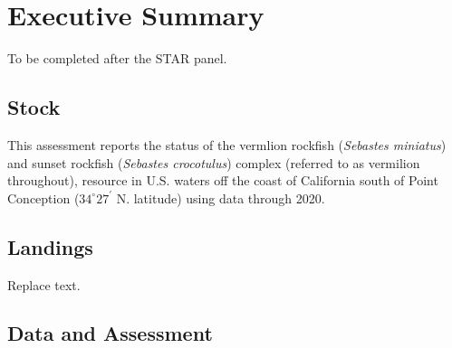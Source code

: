\documentclass[11pt,
  english,
  a4paper,
]{article}
\begin{document}
\newcommand{\lt}{\ensuremath <}
\newcommand{\gt}{\ensuremath >}

\pagebreak
{}
\setcounter{page}{1}

\renewcommand{\thetable}{\roman{table}}
\renewcommand{\thefigure}{\roman{figure}}

\setlength\parskip{0.5em plus 0.1em minus 0.2em}


\hypertarget{executive-summary}{%
\section*{Executive Summary}\label{executive-summary}}

\leavevmode\tagmcend\tagstructend

To be completed after the STAR panel.


\hypertarget{stock}{%
\subsection*{Stock}\label{stock}}

\leavevmode\tagmcend\tagstructend

This assessment reports the status of the vermlion rockfish (\emph{Sebastes miniatus}) and sunset rockfish (\emph{Sebastes crocotulus}) complex (referred to as vermilion throughout), resource in U.S. waters off the coast of California south of Point Conception ({\(34^\circ 27^\prime\)\leavevmode\tagmcend\tagstructend} N. latitude) using data through 2020.


\hypertarget{landings}{%
\subsection*{Landings}\label{landings}}

\leavevmode\tagmcend\tagstructend

Replace text.


\hypertarget{data-and-assessment}{%
\subsection*{Data and Assessment}\label{data-and-assessment}}
\end{document}

